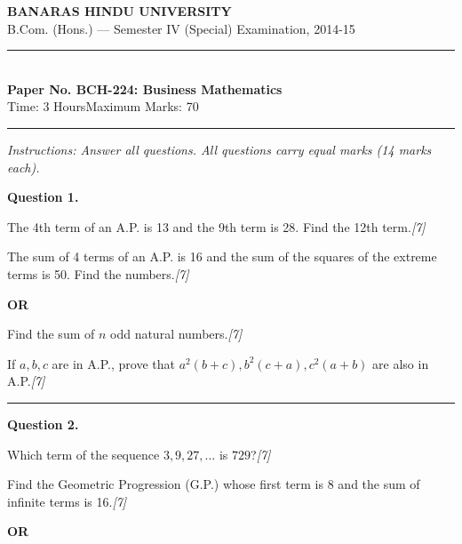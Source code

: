 \documentclass[11pt,a4paper]{article}
\newcommand{\pts}[1]{\hfill   \textit{[#1]}}
\begin{document}
\begin{center}
  {\large\bfseries BANARAS HINDU UNIVERSITY}\\[2pt]
  {\normalsize B.Com. (Hons.) --- Semester IV (Special) Examination, 2014-15}\\[6pt]
  \rule{0.8\linewidth}{0.5pt}\\[6pt]
  {\large\bfseries Paper No. BCH-224: Business Mathematics}\\[4pt]
  {\normalsize Time: 3 Hours\hfill Maximum Marks: 70}
\end{center}

\rule{\linewidth}{0.4pt}

\smallskip



\noindent   \textit{Instructions: Answer all questions. All questions carry equal marks (14 marks each).}

\bigskip




\noindent   \textbf{Question 1.}

\begin{parts}
  \item The 4th term of an A.P. is 13 and the 9th term is 28. Find the 12th term.\pts{7}
  \item The sum of 4 terms of an A.P. is 16 and the sum of the squares of the extreme terms is 50. Find the numbers.\pts{7}
\end{parts}

\centerline{   \textbf{OR}}


\begin{parts}
  \item Find the sum of $n$ odd natural numbers.\pts{7}
  \item If $a, b, c$ are in A.P., prove that $a^2(b + c), b^2(c + a), c^2(a + b)$ are also in A.P.\pts{7}
\end{parts}

\medskip\rule{\linewidth}{0.2pt}




\noindent   \textbf{Question 2.}

\begin{parts}
  \item Which term of the sequence $3, 9, 27, \dots$ is $729$?\pts{7}
  \item Find the Geometric Progression (G.P.) whose first term is 8 and the sum of infinite terms is 16.\pts{7}
\end{parts}

\centerline{   \textbf{OR}}
\end{document}
